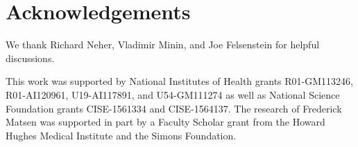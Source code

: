 \documentclass[11pt]{article}
\newcommand{\beginsupplement}{%
        \setcounter{table}{0}
        \renewcommand{\thetable}{S\arabic{table}}%
        \setcounter{figure}{0}
        \renewcommand{\thefigure}{S\arabic{figure}}%
     }
\begin{document}
\section*{Acknowledgements}
We thank Richard Neher, Vladimir Minin, and Joe Felsenstein for helpful discussions.

This work was supported by National Institutes of Health grants R01-GM113246, R01-AI120961, U19-AI117891, and U54-GM111274 as well as National Science Foundation grants CISE-1561334 and CISE-1564137.
The research of Frederick Matsen was supported in part by a Faculty Scholar grant from the Howard Hughes Medical Institute and the Simons Foundation.




\newpage
\beginsupplement


\end{document}

